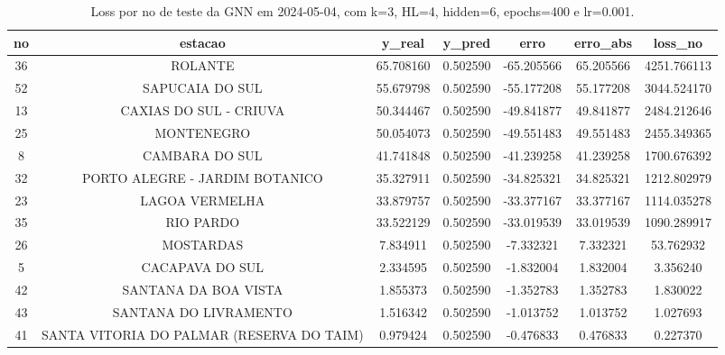 \begin{table}[h]
\centering
\caption{Loss por no de teste da GNN em 2024-05-04, com k=3, HL=4, hidden=6, epochs=400 e lr=0.001.}
\label{tab:gnn_loss_k3_hl4_h6_e400_d20240504}
\begin{tabular}{ccccccc}
\toprule
no & estacao & y\_real & y\_pred & erro & erro\_abs & loss\_no \\
\midrule
36 & ROLANTE & 65.708160 & 0.502590 & -65.205566 & 65.205566 & 4251.766113 \\
52 & SAPUCAIA DO SUL & 55.679798 & 0.502590 & -55.177208 & 55.177208 & 3044.524170 \\
13 & CAXIAS DO SUL - CRIUVA & 50.344467 & 0.502590 & -49.841877 & 49.841877 & 2484.212646 \\
25 & MONTENEGRO & 50.054073 & 0.502590 & -49.551483 & 49.551483 & 2455.349365 \\
8 & CAMBARA DO SUL & 41.741848 & 0.502590 & -41.239258 & 41.239258 & 1700.676392 \\
32 & PORTO ALEGRE - JARDIM BOTANICO & 35.327911 & 0.502590 & -34.825321 & 34.825321 & 1212.802979 \\
23 & LAGOA VERMELHA & 33.879757 & 0.502590 & -33.377167 & 33.377167 & 1114.035278 \\
35 & RIO PARDO & 33.522129 & 0.502590 & -33.019539 & 33.019539 & 1090.289917 \\
26 & MOSTARDAS & 7.834911 & 0.502590 & -7.332321 & 7.332321 & 53.762932 \\
5 & CACAPAVA DO SUL & 2.334595 & 0.502590 & -1.832004 & 1.832004 & 3.356240 \\
42 & SANTANA DA BOA VISTA & 1.855373 & 0.502590 & -1.352783 & 1.352783 & 1.830022 \\
43 & SANTANA DO LIVRAMENTO & 1.516342 & 0.502590 & -1.013752 & 1.013752 & 1.027693 \\
41 & SANTA VITORIA DO PALMAR (RESERVA DO TAIM) & 0.979424 & 0.502590 & -0.476833 & 0.476833 & 0.227370 \\
\bottomrule
\end{tabular}
\end{table}
